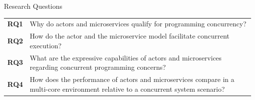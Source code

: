 \documentclass{beamer}
\begin{document}
\begin{frame}{Research Questions}


\pause

\begin{table}
  \begin{tabularx}{\textwidth}{lX}                                                                                                                    \\[10pt]%
    \textbf{RQ1} & Why do actors and microservices qualify for programming concurrency?                                                               \\[10pt]%
    \textbf{RQ2} & How do the actor and the microservice model facilitate concurrent execution?                                                       \\[10pt]%
    \textbf{RQ3} & What are the expressive capabilities of actors and microservices regarding concurrent programming concerns?                        \\[10pt]%
    \textbf{RQ4} & How does the performance of actors and microservices compare in a multi-core environment relative to a concurrent system scenario?
  \end{tabularx}
\end{table}


\end{frame}
\end{document}
